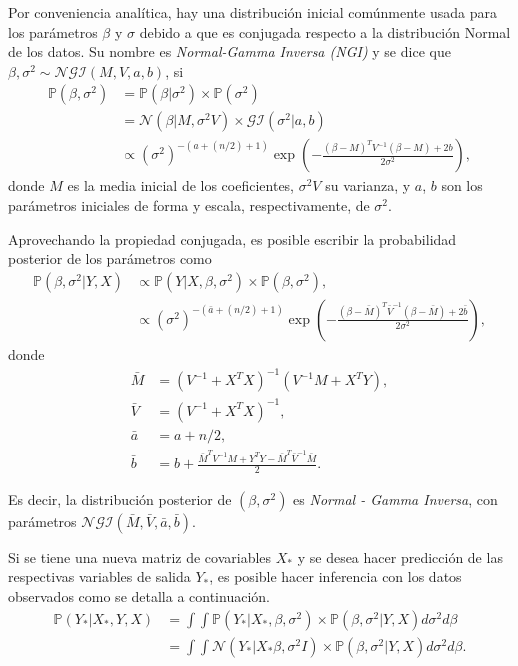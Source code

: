 Por conveniencia anal\'itica, hay una distribuci\'on inicial com\'unmente usada para los par\'ametros $\beta$ y $\sigma$ debido a que es conjugada respecto a la distribuci\'on Normal de los datos. Su nombre es \textit{Normal-Gamma Inversa (NGI)} y se dice que $\beta,\sigma^2 \sim \mathcal{NGI}(M,V,a,b)$, si
\begin{equation*}
\begin{aligned}
    \mathbb{P}(\beta,\sigma^2) 
    &= \mathbb{P}(\beta|\sigma^2) \times \mathbb{P}(\sigma^2) \\
    &= \mathcal{N}(\beta|M, \sigma^2 V) \times \mathcal{GI}(\sigma ^2|a,b) \\
    &\propto (\sigma^2)^{-(a+(n/2)+1)} \exp\left(-\frac{(\beta-M)^TV^{-1}(\beta-M) + 2b}{2\sigma^2}\right),
\end{aligned}
\end{equation*}
donde $M$ es la media inicial de los coeficientes, $\sigma^2 V$ su varianza, y $a$, $b$ son los par\'ametros iniciales de forma y escala, respectivamente, de $\sigma ^2$. 

Aprovechando la propiedad conjugada, es posible escribir la probabilidad posterior de los par\'ametros como
\begin{equation*}
\begin{aligned}
    \mathbb{P}(\beta,\sigma^2 | Y, X) 
    &\propto \mathbb{P}(Y| X, \beta, \sigma^2) \times \mathbb{P}(\beta, \sigma^2), \\
    &\propto (\sigma^2)^{-(\bar{a}+(n/2)+1)} \exp\left(-\frac{(\beta-\bar{M})^T\bar{V}^{-1}(\beta-\bar{M}) + 2\bar{b}}{2\sigma^2}\right),
\end{aligned}
\end{equation*}
donde
\begin{equation*}
\begin{aligned}
    \bar{M} &= (V^{-1} + X^TX)^{-1} (V^{-1}M + X^TY), \\
    \bar{V} &= (V^{-1} + X^TX)^{-1}, \\
    \bar{a} &= a + n/2, \\
    \bar{b} &= b + \frac{\bar{M}^TV^{-1}M + Y^TY - \bar{M}^T\bar{V}^{-1}\bar{M}}{2}.
\end{aligned}
\end{equation*}

Es decir, la distribuci\'on posterior de $(\beta,\sigma^2)$ es \textit{Normal - Gamma Inversa}, con par\'ametros $\mathcal{NGI}(\bar{M},\bar{V},\bar{a},\bar{b})$.

Si se tiene una nueva matriz de covariables $X_*$ y se desea hacer predicci\'on de las respectivas variables de salida $Y_*$, es posible hacer inferencia con los datos observados como se detalla a continuaci\'on.
\begin{equation*}
\begin{aligned}
    \mathbb{P}(Y_*|X_*,Y,X)
    &= \int \int \mathbb{P}(Y_*|X_*,\beta,\sigma^2) \times \mathbb{P}(\beta,\sigma^2|Y,X) d\sigma^2 d\beta \\
    &= \int \int \mathcal{N}(Y_*|X_*\beta,\sigma^2I) \times \mathbb{P}(\beta,\sigma^2|Y,X) d\sigma^2 d\beta.
\end{aligned}
\end{equation*}

